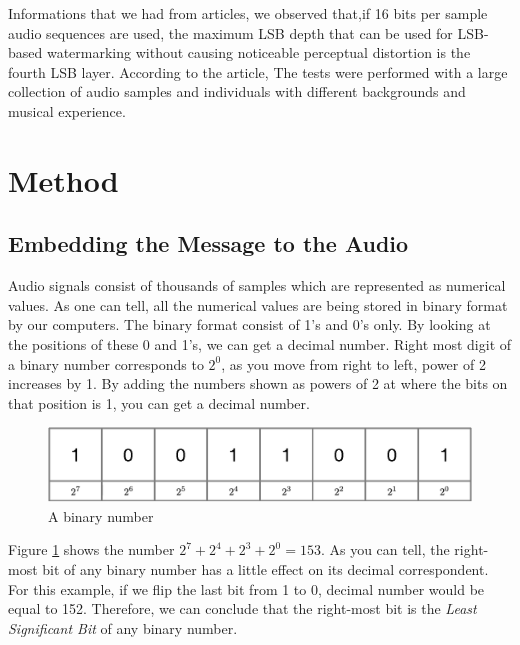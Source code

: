 \documentclass[twocolumns]{IEEEtran}
\begin{document}
	
	Informations that we had from articles, we observed that,if
	16 bits per sample audio sequences are used,  the maximum LSB depth that
	can be used for LSB-based watermarking without causing
	noticeable perceptual distortion is the fourth LSB layer\cite{Jayaram}. According to the article, The tests
	were performed with a large collection of audio samples
	and individuals with different backgrounds and musical
	experience.
	
	\section{Method}
	\subsection{Embedding the Message to the Audio}
	Audio signals consist of thousands of samples which are represented as numerical values. As one can tell, all the numerical values are being stored in binary format by our computers. The binary format consist of 1's and 0's only. By looking at the positions of these 0 and 1's, we can get a decimal number\cite{Jayaram}. Right most digit of a binary number corresponds to $2^0$, as you move from right to left, power of 2 increases by 1. By adding the numbers shown as powers of 2 at where the bits on that position is 1, you can get a decimal number.
	\begin{figure}[h]
		\centering
		\includegraphics[scale=.5]{binary_num.eps}
		\caption{A binary number}
		\label{fig:binary}
	\end{figure}

	Figure \ref{fig:binary} shows the number $2^7 + 2^4 + 2^3 + 2^0 = 153$. As you can tell, the right-most bit of any binary number has a little effect on its decimal correspondent. For this example, if we flip the last bit from 1 to 0, decimal number would be equal to 152. Therefore, we can conclude that the right-most bit is the \textit{Least Significant Bit} of any binary number.
	
\end{document}
